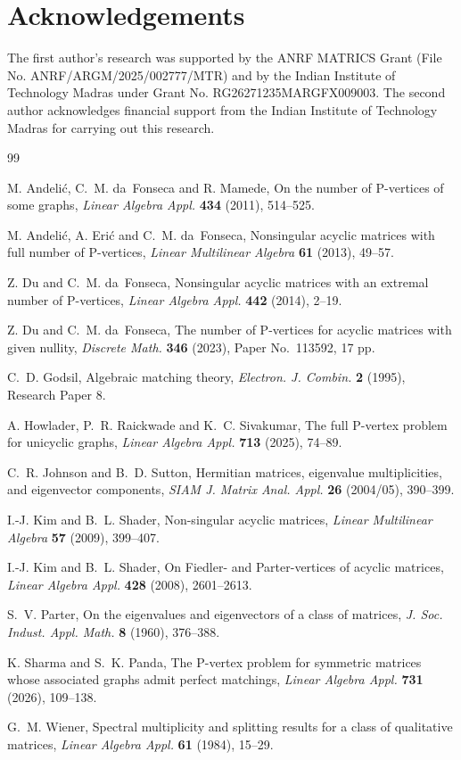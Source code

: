 \documentclass[12pt,reqno]{amsart}
\theoremstyle{plain}
\theoremstyle{definition}
\theoremstyle{block}
\theoremstyle{remark}
\numberwithin{equation}{section}
\begin{document}
\section*{Acknowledgements}
The first author's research was supported by the ANRF MATRICS Grant (File No. ANRF/ARGM/2025/002777/MTR) and by the Indian Institute of Technology Madras under Grant No. RG26271235MARGFX009003. The second author acknowledges financial support from the Indian Institute of Technology Madras for carrying out this research.
\begin{thebibliography}{99}

M. Andeli\'c, C.~M. da~Fonseca and R. Mamede,
On the number of P-vertices of some graphs,
\emph{Linear Algebra Appl.} \textbf{434} (2011), 514--525.

M. Andeli\'c, A. Eri\'c and C.~M. da~Fonseca,
Nonsingular acyclic matrices with full number of P-vertices,
\emph{Linear Multilinear Algebra} \textbf{61} (2013), 49--57.

Z. Du and C.~M. da~Fonseca,
Nonsingular acyclic matrices with an extremal number of P-vertices,
\emph{Linear Algebra Appl.} \textbf{442} (2014), 2--19.

Z. Du and C.~M. da~Fonseca,
The number of P-vertices for acyclic matrices with given nullity,
\emph{Discrete Math.} \textbf{346} (2023),
Paper No.~113592, 17 pp.

C.~D. Godsil,
Algebraic matching theory,
\emph{Electron. J. Combin.} \textbf{2} (1995),
Research Paper 8.

A. Howlader, P.~R. Raickwade and K.~C. Sivakumar,
The full P-vertex problem for unicyclic graphs,
\emph{Linear Algebra Appl.} \textbf{713} (2025), 74--89.


C.~R. Johnson and B.~D. Sutton,
Hermitian matrices, eigenvalue multiplicities, and eigenvector
components,
\emph{SIAM J. Matrix Anal. Appl.} \textbf{26} (2004/05),
390--399.

I.-J. Kim and B.~L. Shader,
Non-singular acyclic matrices,
\emph{Linear Multilinear Algebra} \textbf{57} (2009), 399--407.

I.-J. Kim and B.~L. Shader,
On Fiedler- and Parter-vertices of acyclic matrices,
\emph{Linear Algebra Appl.} \textbf{428} (2008), 2601--2613.

S.~V. Parter,
On the eigenvalues and eigenvectors of a class of matrices,
\emph{J. Soc. Indust. Appl. Math.} \textbf{8} (1960), 376--388.

K. Sharma and S.~K. Panda,
The P-vertex problem for symmetric matrices whose associated graphs
admit perfect matchings,
\emph{Linear Algebra Appl.} \textbf{731} (2026), 109--138.

G.~M. Wiener,
Spectral multiplicity and splitting results for a class of qualitative
matrices,
\emph{Linear Algebra Appl.} \textbf{61} (1984), 15--29.

\end{thebibliography}
\end{document}
